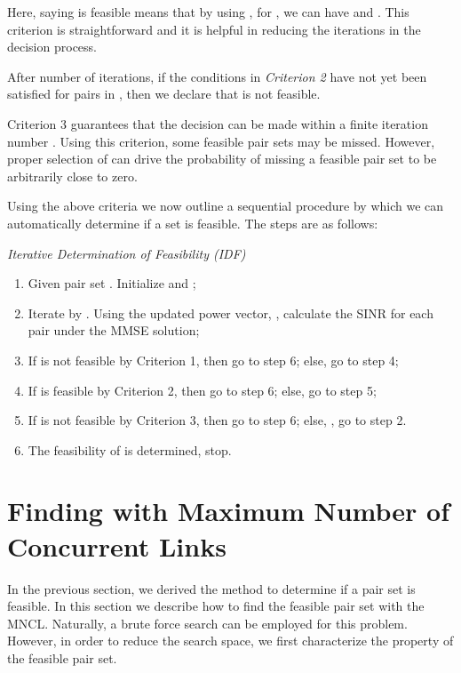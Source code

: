 \documentclass[draftcls,onecolumn,peerview,12pt]{IEEEtran}
\begin{document}
Here, saying  is feasible means that by using
, for , we can have
 and . This criterion
is straightforward and it is helpful in reducing the iterations in
the decision process.

\begin{criterion}
After  number of iterations, if the conditions in
\textit{Criterion 2} have not yet been satisfied for pairs in ,
then we declare that  is not feasible.
\end{criterion}

Criterion 3 guarantees that the decision can be made within a finite
iteration number . Using this criterion, some feasible
pair sets may be missed. However, proper selection of  can
drive the probability of missing a feasible pair set to be
arbitrarily close to zero.

Using the above criteria we now outline a sequential procedure by
which we can automatically determine if a set  is feasible.
The steps are as follows:

\textit{Iterative Determination of Feasibility (IDF)}
\begin{enumerate}
\item Given pair set . Initialize  and ;

\item Iterate by . Using the updated power vector, ,
calculate the SINR for each pair under the MMSE solution;

\item If  is not feasible by Criterion 1, then go to step 6;
else, go to step 4;

\item If  is feasible by Criterion 2, then go to step 6; else,
go to step 5;

\item If  is not feasible by Criterion 3, then go to step 6;
else, , go to step 2.

\item The feasibility of  is determined, stop.
\end{enumerate}

\section{Finding  with Maximum Number of Concurrent Links}
In the previous section, we derived the method to determine if a
pair set is feasible. In this section we describe how to find the
feasible pair set with the MNCL. Naturally, a brute force search can
be employed for this problem. However, in order to reduce the search
space, we first characterize the property of the feasible pair set.
\end{document}
